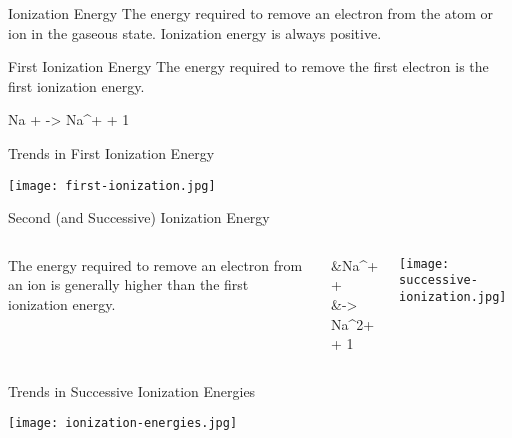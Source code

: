 \documentclass[notes=show]{beamer}
\begin{document}
\begin{frame}[c]{Ionization Energy}
	The energy required to remove an electron from the atom or ion
	in the gaseous state. Ionization energy is \alert{always}
	positive.

	\bigskip

	\begin{block}{First Ionization Energy}
		The energy required to remove the \alert{first} electron is the
		\alert{first ionization energy}.
		\begin{reaction*}
			Na\gas{} +  -> Na^{+}\gas{} + 1 \el
		\end{reaction*}
	\end{block}
\end{frame}

\begin{frame}{Trends in First Ionization Energy}
	\begin{center}
		\texttt{[image: first-ionization.jpg]}
	\end{center}

\end{frame}

\begin{frame}{Second (and Successive) Ionization Energy}
	\begin{columns}
		The energy required to remove an electron from an \alert{ion} is
		generally higher than the first ionization energy.
		
		\begin{reactions*}
			&Na^{+}\gas{} +  \\
			&\qquad -> Na^{2+}\gas{} + 1 \el
		\end{reactions*}
		\begin{center}
			\texttt{[image: successive-ionization.jpg]}
		\end{center}
	\end{columns}
\end{frame}

\begin{frame}{Trends in Successive Ionization Energies}
	\begin{center}
		\texttt{[image: ionization-energies.jpg]}
	\end{center}
\end{frame}
\end{document}

